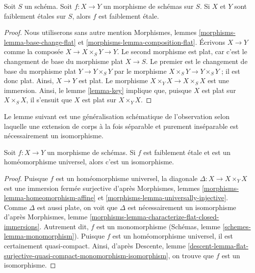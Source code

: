 \begin{lemma}
\label{lemma-weakly-etale-permanence}
Soit $S$ un schéma. Soit $f : X \to Y$ un morphisme de schémas sur $S$.
Si $X$ et $Y$ sont faiblement \'etales sur $S$, alors $f$ est faiblement \'etale.
\end{lemma}

\begin{proof}
Nous utiliserons sans autre mention Morphismes, lemmes \ref{morphisms-lemma-base-change-flat} et
\ref{morphisms-lemma-composition-flat}.
Écrivons $X \to Y$ comme la composée $X \to X \times_S Y \to Y$.
Le second morphisme est plat, car c'est le changement de base du morphisme plat
$X \to S$. Le premier est le changement de base du morphisme plat
$Y \to Y \times_S Y$ par le morphisme $X \times_S Y \to Y \times_S Y$ ;
il est donc plat. Ainsi, $X \to Y$ est plat. Le morphisme
$X \times_Y X \to X \times_S X$ est une immersion.
Ainsi, le lemme \ref{lemma-key} implique que, puisque
$X$ est plat sur $X \times_S X$, il s'ensuit que $X$ est
plat sur $X \times_Y X$.
\end{proof}

\noindent
Le lemme suivant est une généralisation schématique de l'observation
selon laquelle une extension de corps à la fois séparable et purement inséparable
est nécessairement un isomorphisme.

\begin{lemma}
\label{lemma-weakly-etale-universal-homeomorphism}
Soit $f : X \to Y$ un morphisme de schémas. Si $f$ est faiblement \'etale et
est un homéomorphisme universel, alors c'est un isomorphisme.
\end{lemma}

\begin{proof}
Puisque $f$ est un homéomorphisme universel, la diagonale
$\Delta : X \to X \times_Y X$ est une immersion fermée surjective d'après
Morphismes, lemmes \ref{morphisms-lemma-homeomorphism-affine} et
\ref{morphisms-lemma-universally-injective}. Comme $\Delta$ est aussi
plate, on voit que $\Delta$ est nécessairement un isomorphisme d'après
Morphismes, lemme \ref{morphisms-lemma-characterize-flat-closed-immersions}.
Autrement dit, $f$ est un monomorphisme
(Schémas, lemme \ref{schemes-lemma-monomorphism}).
Puisque $f$ est un homéomorphisme universel, il est certainement
quasi-compact. Ainsi, d'après Descente, lemme
\ref{descent-lemma-flat-surjective-quasi-compact-monomorphism-isomorphism},
on trouve que $f$ est un isomorphisme.
\end{proof}

